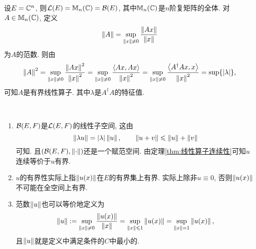     \begin{Example}
        设$ E=\mathbb{C}^n $, 则$ \mathcal{L}(E)=\mathbb{M}_n(\mathbb{C})=\mathcal{B}(E) $, 其中$ \mathbb{M}_n(\mathbb{C}) $是$ n $阶复矩阵的全体. 对$ A\in\mathbb{M}_n(\mathbb{C}) $, 定义
        \[
            \left\| A \right\|=\sup_{\left\| x \right\|\ne 0}\frac{\left\| Ax \right\|}{\left\| x \right\|}
        \]
        为$ A $的范数. 则由
        \[
            \left\| A \right\|^2=\sup_{\left\| x \right\|\ne 0}\frac{\left\| Ax \right\|^2}{\left\| x \right\|^2}=\sup_{\left\| x \right\|\ne 0}\frac{\left\langle Ax,Ax \right\rangle}{\left\| x \right\|^2}=\sup_{\left\| x \right\|\ne 0}\frac{\left\langle A^\dagger Ax,x \right\rangle}{\left\| x \right\|^2}=\sup\{\left| \lambda \right| \},
        \]
        可知$ A $是有界线性算子. 其中$ \lambda $是$ A^\dagger A $的特征值.
    \end{Example}
    
    \begin{Remark}~
    \begin{enumerate}[(1)]\label{rmk:范数性质}
        \item $ \mathcal{B}(E,F) $是$ \mathcal{L}(E,F) $的线性子空间, 这由
        \[
            \left\| \lambda u \right\|=\left| \lambda \right| \left\| u \right\|,\qquad \left\| u+v \right\|\leqslant\left\| u \right\|+\left\| v \right\|
        \]
        可知. 且$ (\mathcal{B}(E,F),\left\| \cdot \right\|) $还是一个赋范空间. 由定理\ref{thm:线性算子连续性}可知$ u $连续等价于$ u $有界.
        
        \item $ u $的有界性实际上指$ \left\| u(x) \right\| $在$ E $的有界集上有界. 实际上除非$ u\equiv 0 $, 否则$ \left\| u(x) \right\| $不可能在全空间上有界.
        
        \item\label{rmk:范数性质最小C} 范数$ \left\| u \right\| $也可以等价地定义为
        \[
            \left\| u \right\|:=\sup_{\left\| x \right\|\ne 0}\frac{\left\| u(x) \right\|}{\left\| x \right\|}=\sup_{\left\| x \right\|\leqslant 1}\left\| u(x) \right\|=\sup_{\left\| x \right\|=1}\left\| u(x) \right\|,
        \]
        且$ \left\| u \right\| $就是定义中满足条件的$ C $中最小的.
    \end{enumerate}
    \end{Remark}

